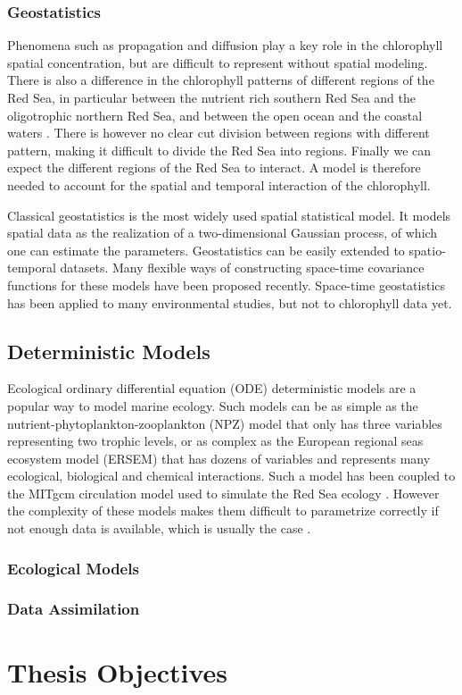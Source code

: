 \subsubsection{Geostatistics}

Phenomena such as propagation and diffusion play a key role in the chlorophyll spatial concentration, but are difficult to represent without spatial modeling. There is also a difference in the chlorophyll patterns of different regions of the Red Sea, in particular between the nutrient rich southern Red Sea and the oligotrophic northern Red Sea, and between the open ocean and the coastal waters \cite{Raitsos2013}. There is however no clear cut division between regions with different pattern, making it difficult to divide the Red Sea into regions. Finally we can expect the different regions of the Red Sea to interact. A model is therefore needed to account for the spatial and temporal interaction of the chlorophyll.

Classical geostatistics is the most widely used spatial statistical model. It models spatial data as the realization of a two-dimensional Gaussian process, of which one can estimate the parameters. Geostatistics can be easily extended to spatio-temporal datasets. Many flexible ways of constructing space-time covariance functions for these models have been proposed recently. Space-time geostatistics has been applied to many environmental studies, but not to chlorophyll data yet.

\subsection{Deterministic Models}
Ecological ordinary differential equation (ODE) deterministic models are a popular way to model marine ecology. Such models can be as simple as the nutrient-phytoplankton-zooplankton (NPZ) model that only has three variables representing two trophic levels, or as complex as the European regional seas ecosystem model (ERSEM) that has dozens of variables and represents many ecological, biological and chemical interactions. Such a model has been coupled to the MITgcm circulation model used to simulate the Red Sea ecology \cite{Triantafyllou2014}. However the complexity of these models makes them difficult to parametrize correctly if not enough data is available, which is usually the case \cite{Anderson2005}.

\subsubsection{Ecological Models}
\subsubsection{Data Assimilation}

\section{Thesis Objectives}
